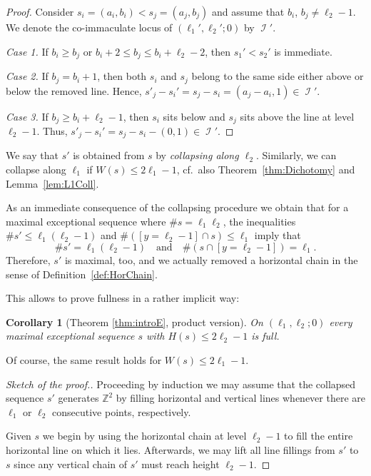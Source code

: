 \documentclass[11pt]{article}
\newtheorem{coro}[theo]{Corollary}
\theoremstyle{definition}
\numberwithin{equation}{section}
\newcommand{\Z}{\mathbb Z}
\newcommand{\CI}{{\mathcal I}}
\newcommand{\nImm}{\operatorname{\CI}}
\newcommand{\cl}{s}
\newcommand{\mes}{maximal exceptional sequence}
\renewcommand{\sharp}{\#}
\newcommand{\thFull}{\ref{thm:introE}}
\begin{document}
\begin{proof}
Consider $\cl_i=(a_i,b_i)<\cl_j=(a_j,b_j)$ and 
assume that $b_i$, $b_j\neq\ell_2-1$. We denote 
the {co-immaculate} locus of $(\ell_1',\ell_2';0)$
by $\nImm'$.

{\em Case 1.} If $b_i\geq b_j$ or $b_i+2\leq b_j
\leq b_i+\ell_2-2$, then $\cl_1'<\cl_2'$ is 
immediate.

{\em Case 2.} If $b_j=b_i+1$, then both $\cl_i$ 
and $\cl_j$ belong to the same side either above 
or below the removed line. Hence, $\cl'_j-\cl_i'=
\cl_j-\cl_i=(a_j-a_i,1)\in\nImm'$.

{\em Case 3.} If $b_j\geq b_i+\ell_2-1$, then 
$\cl_i$ sits below and $\cl_j$ sits above the 
line at level $\ell_2-1$. Thus,
$\cl'_j-\cl_i'=\cl_j-\cl_i-(0,1)\in\nImm'$.
\end{proof}

We say that $\cl'$ is obtained from $\cl$ by 
{\em collapsing along $\ell_2$}. Similarly, we can
collapse along $\ell_1$ if $W(\cl)\leq2\ell_1-1$, 
cf.\ also Theorem~\ref{thm:Dichotomy} and
Lemma~\ref{lem:L1Coll}.

As an immediate consequence of the collapsing
procedure we obtain that
for a {\mes} where $\sharp\cl=\ell_1\ell_2$, the
inequalities $\sharp\cl'\leq \ell_1(\ell_2-1)$ and 
$\sharp([y=\ell_2-1]\cap\cl)\leq\ell_1$ imply that
$$
\sharp\cl'= \ell_1(\ell_2-1)
\quad\mbox{and}\quad
\sharp(\cl\cap[y=\ell_2-1])=\ell_1.
$$
Therefore, $\cl'$ is maximal, too, 
and we actually removed a horizontal chain in
the sense of Definition~\ref{def:HorChain}.

This allows to prove fullness in a rather 
implicit way:

\begin{coro}[Theorem {\thFull}, product version]
\label{cor:FullnessTheoremPaPb}
On $(\ell_1,\ell_2;0)$ every maximal 
exceptional sequence $\cl$ with 
$H(\cl)\leq2\ell_2-1$ is full.
\end{coro}

Of course, the same result holds for 
$W(\cl)\leq2\ell_1-1$.

\begin{proof}[Sketch of the proof.]
Proceeding by induction we may assume 
that the collapsed sequence $\cl'$ 
generates $\Z^2$ by filling horizontal and 
vertical lines whenever there are
$\ell_1$ or $\ell_2$ consecutive points, 
respectively.

Given $\cl$ we begin by using the horizontal chain 
at level $\ell_2-1$ to fill the entire horizontal 
line on which it lies. Afterwards, we may lift all 
line fillings from $\cl'$ to $\cl$ since any vertical
chain of $\cl'$ must reach height $\ell_2-1$.
\end{proof}
\end{document}
